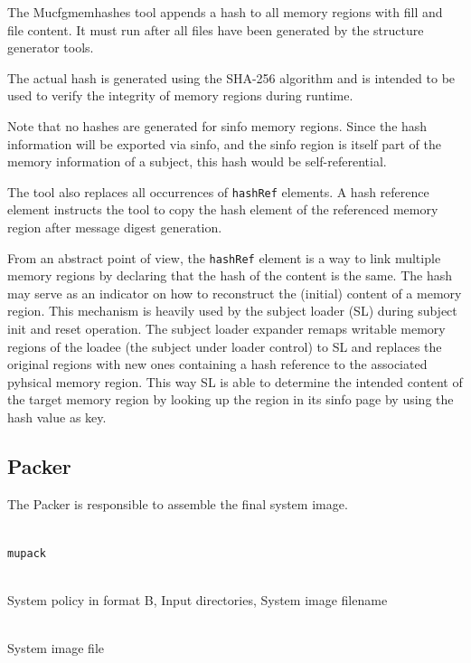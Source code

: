 \documentclass[a4paper,twoside,titlepage]{article}
\begin{document}
The Mucfgmemhashes tool appends a hash to all memory regions with fill and file
content. It must run after all files have been generated by the structure
generator tools.

The actual hash is generated using the SHA-256 algorithm and is intended to be
used to verify the integrity of memory regions during runtime.

Note that no hashes are generated for sinfo memory regions. Since the
hash information will be exported via sinfo, and the sinfo region is
itself part of the memory information of a subject, this hash would be
self-referential.

The tool also replaces all occurrences of \texttt{hashRef} elements. A hash
reference element instructs the tool to copy the hash element of the referenced
memory region after message digest generation.

From an abstract point of view, the \texttt{hashRef} element is a way to link
multiple memory regions by declaring that the hash of the content is the same.
The hash may serve as an indicator on how to reconstruct the (initial) content
of a memory region. This mechanism is heavily used by the subject loader (SL)
during subject init and reset operation. The subject loader expander remaps
writable memory regions of the loadee (the subject under loader control) to SL
and replaces the original regions with new ones containing a hash reference to
the associated pyhsical memory region. This way SL is able to determine the
intended content of the target memory region by looking up the region in its
sinfo page by using the hash value as key.

\subsection{Packer}
\label{sec:tools-packer}
The Packer is responsible to assemble the final system image.

\begin{description} \itemsep1pt \parskip0pt
	\item[Name] \hfill \\
		\texttt{mupack}
	\item[Input] \hfill \\
		System policy in format B, Input directories, System image filename
	\item[Output] \hfill \\
		System image file
\end{description}
\end{document}
